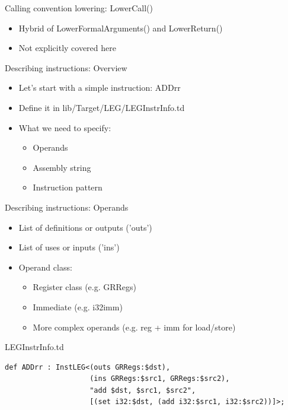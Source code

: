 \begin{frame}{Calling convention lowering: LowerCall()}

\begin{itemize}
    \item Hybrid of LowerFormalArguments() and LowerReturn()
    \item Not explicitly covered here
\end{itemize}

\end{frame}


\begin{frame}{Describing instructions: Overview}

\begin{itemize}
    \item Let's start with a simple instruction: ADDrr
    \item Define it in lib/Target/LEG/LEGInstrInfo.td
    \item What we need to specify:
    \begin{itemize}
        \item Operands
        \item Assembly string
        \item Instruction pattern
    \end{itemize}
\end{itemize}

\end{frame}


\begin{frame}[fragile]{Describing instructions: Operands}

\begin{itemize}
    \item List of definitions or outputs ('outs')
    \item List of uses or inputs ('ins')
    \item Operand class:
    \begin{itemize}
        \item Register class (e.g. GRRegs)
        \item Immediate (e.g. i32imm)
        \item More complex operands (e.g. reg + imm for load/store)
    \end{itemize}
\end{itemize}

\begin{block}{LEGInstrInfo.td}
\begin{lstlisting}
def ADDrr : InstLEG<(outs GRRegs:$dst),
                    (ins GRRegs:$src1, GRRegs:$src2),
                    "add $dst, $src1, $src2",
                    [(set i32:$dst, (add i32:$src1, i32:$src2))]>;
\end{lstlisting}
\end{block}

\end{frame}

